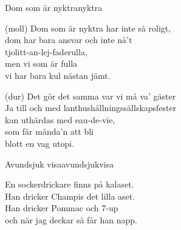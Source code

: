 \newpage

\begin{song}{Dom som är nyktra}{nyktra}
\begin{vers}
(moll) Dom som är nyktra har inte så roligt,\\
dom har bara ansvar och inte nå't\\
tjolitt-an-lej-faderulla,\\
men vi som är fulla\\
vi har bara kul nästan jämt.\\
\end{vers}
\begin{vers}
(dur) Det gör det samma var vi må va' gäster\\
Ja till och med lanthushållningssällskapsfester\\
kan uthärdas med eau-de-vie,\\
som får månda'n att bli\\
blott en vag utopi.\\
\end{vers}
\end{song}
\begin{song}{Avundsjuk visa}{avundsjukvisa}
\begin{vers}
En sockerdrickare finns på kalaset.\\
Han dricker Champis det lilla aset.\\
Han dricker Pommac och 7-up\\
och när jag deckar så får han napp.\\
\end{vers}
\end{song}

\newpage

